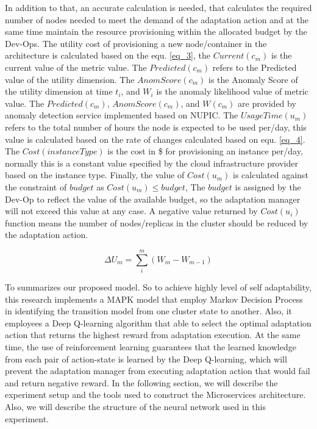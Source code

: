 \documentclass{ieeeaccess}
\begin{document}
 In addition to that, an accurate calculation is needed, that calculates the required number of nodes needed to meet the demand of the adaptation action and at the same time maintain the resource provisioning within the allocated budget by the Dev-Ops. The utility cost of provisioning a new node/container in the architecture is calculated based on the equ. \ref{eq_3}, the $Current(c_{m})$ is the current value of the metric value. The $Predicted(c_{m})$ refers to the Predicted value of the utility dimension. The $AnomScore(c_{m})$ is the Anomaly Score of the utility dimension at time $t_{i}$, and $W_{i}$ is the anomaly likelihood value of metric value. The $Predicted(c_{m})$, $AnomScore(c_{m})$, and $W(c_{m})$ are provided by anomaly detection service implemented based on NUPIC. The $UsageTime(u_{m})$ refers to the total number of hours the node is expected to be used per/day, this value is calculated based on the rate of changes calculated based on equ. \ref{eq_4}. The $Cost(instanceType)$ is the cost in \$ for provisioning an instance per/day, normally this is a constant value specified by the cloud infrastructure provider based on the instance type. Finally, the value of $Cost(u_{m})$ is calculated against the constraint of $budget$ as $ Cost(u_{m})  \leq  budget $, The $budget$ is assigned by the Dev-Op to reflect the value of the available budget, so the adaptation manager will not exceed this value at any case. A negative value returned by $Cost(u_{i})$ function means the number of nodes/replicas in the cluster should be reduced by the adaptation action. 

 \begin{equation}
\label{eq_4}
\Delta U_{m}=\sum_{i}^{m} (W_{m} - W_{m-1})
\end{equation}
 
To summarizes our proposed model. So to achieve highly level of self adaptability, this research implements a MAPK model that employ Markov Decision Process in identifying the transition model from one cluster state to another.  Also, it employees a Deep Q-learning algorithm that able to select the optimal adaptation action that returns the highest reward from adaptation execution. At the same time, the use of reinforcement learning guarantees that the learned knowledge from each pair of action-state is learned by the Deep Q-learning, which will prevent the adaptation manager from executing adaptation action that would fail and return negative reward. In the following section, we will describe the experiment setup and the tools used to construct the Microservices architecture. Also, we will describe the  structure of the neural network used in this experiment. 
\end{document}
